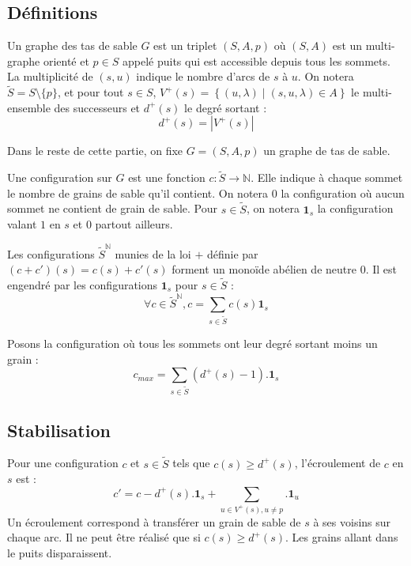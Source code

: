 \subsection{Définitions}

\begin{definition}
Un graphe des tas de sable $G$ est un triplet $(S, A, p)$ où $(S, A)$ est
un multi-graphe orienté
et $p \in S$ appelé puits qui est accessible depuis tous les sommets.
La multiplicité de $(s, u)$ indique le nombre d'arcs de $s$ à $u$.
On notera $\widetilde{S} = S \setminus \{p\}$, et pour tout $s \in S$, $V^+(s)
= \left\{ (u, \lambda) \;|\; (s, u, \lambda) \in A \right\}$ le multi-ensemble
des successeurs et $d^+(s)$ le degré sortant :
$$
d^+(s) = \left| V^+(s) \right|
$$
\end{definition}

Dans le reste de cette partie, on fixe
$G = (S, A, p)$ un graphe de tas de sable.

\begin{definition}
Une configuration sur $G$ est une fonction
$c: \widetilde{S} \rightarrow \mathbb{N}$.
Elle indique à chaque sommet le nombre de grains de sable qu'il contient.
On notera $0$ la configuration où aucun sommet ne contient de grain de sable.
Pour $s\in \widetilde{S}$, on notera $\mathbf{1}_s$ la configuration valant $1$ en $s$
et $0$ partout ailleurs.

Les configurations $\widetilde{S}^{\mathbb{N}}$  munies de la loi $+$ définie
par $(c + c')(s) = c(s) + c'(s)$ forment un monoïde abélien de neutre $0$.
Il est engendré par les configurations $\mathbf{1}_s$
pour $s \in \widetilde{S}$ :
$$
\forall c \in \widetilde{S}^{\mathbb{N}},
c = \sum_{s \in \widetilde{S}} c(s) \mathbf{1}_s
$$

Posons la configuration où tous les sommets ont leur degré sortant moins un grain :
$$
c_{max} = \sum_{s \in \widetilde{S}} \left(d^+(s) - 1\right) . \mathbf{1}_s
$$
\end{definition}

\subsection{Stabilisation}

\begin{definition}[Écroulement]
Pour une configuration $c$ et $s \in \widetilde{S}$ tels que $c(s) \geqslant
d^+(s)$, l'écroulement de $c$ en $s$ est :
$$c' = c - d^+(s) . \mathbf{1}_s + \sum_{u \in V^+(s), u \neq p} . \mathbf{1}_u$$
Un écroulement correspond à transférer un grain de sable de $s$ à ses voisins
sur chaque arc. Il ne peut être réalisé que si $c(s) \geqslant d^+(s)$.
Les grains allant dans le puits disparaissent.
\end{definition}

